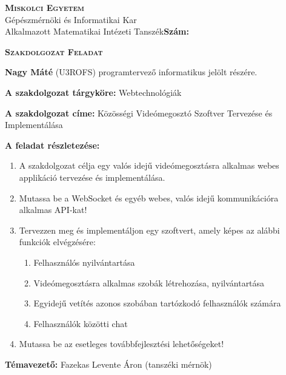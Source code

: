 \noindent
\textsc{\textbf{Miskolci Egyetem}}\\
Gépészmérnöki és Informatikai Kar\\
Alkalmazott Matematikai Intézeti Tanszék\hspace*{4cm}\hfil \textbf{Szám:}

\vspace{0.5cm}
\begin{center}
    \large\textsc{\textbf{Szakdolgozat Feladat}}
\end{center}
\vspace{0.5cm}
\textbf{Nagy Máté} (U3ROFS) programtervező informatikus jelölt részére.

\bigskip
\noindent\textbf{A szakdolgozat tárgyköre:} Webtechnológiák

\bigskip
\noindent\textbf{A szakdolgozat címe:} Közösségi Videómegosztó Szoftver Tervezése és Implementálása

\bigskip
\noindent\textbf{A feladat részletezése:}
\begin{enumerate}
    \item A szakdolgozat célja egy valós idejű videómegosztásra alkalmas webes applikáció tervezése és implementálása.
    \item Mutassa be a WebSocket és egyéb webes, valós idejű kommunikációra alkalmas API-kat!
    \item Tervezzen meg \'es implement\'aljon egy szoftvert, amely k\'epes az al\'abbi funkci\'ok elvégzésére:
          \begin{enumerate}
              \item Felhasználós nyilvántartása
              \item Videómegosztásra alkalmas szobák létrehozása, nyilvántartása
              \item Egyidejű vetítés azonos szobában tartózkodó felhasználók számára
              \item Felhasználók közötti chat
          \end{enumerate}
    \item Mutassa be az esetleges tov\'abbfejleszt\'esi lehet\H os\'egeket!
\end{enumerate}

\medskip

\vfill

\noindent\textbf{Témavezető:} Fazekas Levente \'Aron (tansz\'eki m\'ern\"ok)



